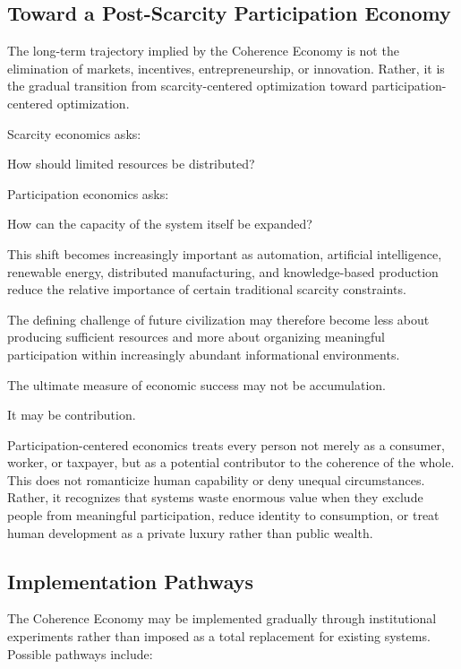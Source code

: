 \documentclass[12pt]{article}
\begin{document}
\subsection{Toward a Post-Scarcity Participation Economy}

The long-term trajectory implied by the Coherence Economy is not the elimination of markets, incentives, entrepreneurship, or innovation. Rather, it is the gradual transition from scarcity-centered optimization toward participation-centered optimization.

Scarcity economics asks:

How should limited resources be distributed?

Participation economics asks:

How can the capacity of the system itself be expanded?

This shift becomes increasingly important as automation, artificial intelligence, renewable energy, distributed manufacturing, and knowledge-based production reduce the relative importance of certain traditional scarcity constraints.

The defining challenge of future civilization may therefore become less about producing sufficient resources and more about organizing meaningful participation within increasingly abundant informational environments.

The ultimate measure of economic success may not be accumulation.

It may be contribution.

Participation-centered economics treats every person not merely as a consumer, worker, or taxpayer, but as a potential contributor to the coherence of the whole. This does not romanticize human capability or deny unequal circumstances. Rather, it recognizes that systems waste enormous value when they exclude people from meaningful participation, reduce identity to consumption, or treat human development as a private luxury rather than public wealth.

\subsection{Implementation Pathways}

The Coherence Economy may be implemented gradually through institutional experiments rather than imposed as a total replacement for existing systems. Possible pathways include:
\end{document}
